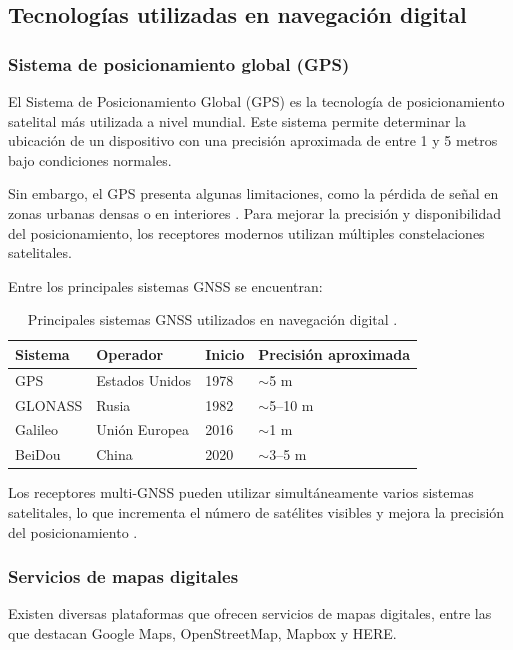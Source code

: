\subsection{Tecnologías utilizadas en navegación digital}

\subsubsection{Sistema de posicionamiento global (GPS)}

El Sistema de Posicionamiento Global (GPS) es la tecnología de posicionamiento satelital más utilizada a nivel mundial. Este sistema permite determinar la ubicación de un dispositivo con una precisión aproximada de entre 1 y 5 metros bajo condiciones normales.\cite{zbotic_gnss}

Sin embargo, el GPS presenta algunas limitaciones, como la pérdida de señal en zonas urbanas densas o en interiores \cite{zbotic_gnss}. Para mejorar la precisión y disponibilidad del posicionamiento, los receptores modernos utilizan múltiples constelaciones satelitales.

Entre los principales sistemas GNSS se encuentran:

\begin{table}[H]
\centering
\begin{tabular}{llll}
\hline
Sistema & Operador & Inicio & Precisión aproximada \\
\hline
GPS & Estados Unidos & 1978 & $\sim$5 m \\
GLONASS & Rusia & 1982 & $\sim$5--10 m \\
Galileo & Unión Europea & 2016 & $\sim$1 m \\
BeiDou & China & 2020 & $\sim$3--5 m \\
\hline
\end{tabular}
\caption{Principales sistemas GNSS utilizados en navegación digital \cite{zbotic_gnss}.}
\end{table}

Los receptores multi-GNSS pueden utilizar simultáneamente varios sistemas satelitales, lo que incrementa el número de satélites visibles y mejora la precisión del posicionamiento \cite{zbotic_gnss}.

\subsubsection{Servicios de mapas digitales}

Existen diversas plataformas que ofrecen servicios de mapas digitales, entre las que destacan Google Maps, OpenStreetMap, Mapbox y HERE.

